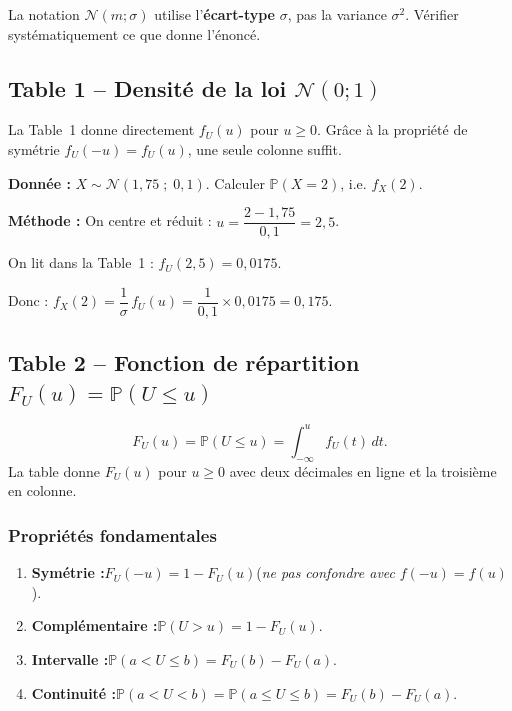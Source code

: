 \documentclass[11pt,a4paper]{article}
\newcommand{\N}{\mathcal{N}}
\newcommand{\Prob}{\mathbb{P}}
\renewcommand{\P}{\Prob}
\begin{document}
\begin{alertbox}[Attention]
La notation $\N(m;\sigma)$ utilise l'\textbf{\'ecart-type} $\sigma$, pas la variance $\sigma^2$. V\'erifier syst\'ematiquement ce que donne l'\'enonc\'e.
\end{alertbox}

\subsection{Table 1 -- Densit\'e de la loi $\N(0;1)$}

La Table~1 donne directement $f_U(u)$ pour $u \geq 0$. Gr\^ace \`a la propri\'et\'e de sym\'etrie $f_U(-u) = f_U(u)$, une seule colonne suffit.

\begin{exbox}
\textbf{Donn\'ee :} $X \sim \N(1{,}75\;;\;0{,}1)$. Calculer $\P(X = 2)$, i.e. $f_X(2)$.

\textbf{M\'ethode :} On centre et r\'eduit : $u = \dfrac{2-1{,}75}{0{,}1} = 2{,}5$.

On lit dans la Table~1 : $f_U(2{,}5) = 0{,}0175$.

Donc : $f_X(2) = \dfrac{1}{\sigma}\,f_U(u) = \dfrac{1}{0{,}1}\times 0{,}0175 = 0{,}175.$
\end{exbox}

\subsection{Table 2 -- Fonction de r\'epartition $F_U(u) = \P(U \leq u)$}

\begin{defbox}
$$F_U(u) = \P(U \leq u) = \int_{-\infty}^{u} f_U(t)\,dt.$$
La table donne $F_U(u)$ pour $u \geq 0$ avec deux d\'ecimales en ligne et la troisi\`eme en colonne.
\end{defbox}

\subsubsection{Propri\'et\'es fondamentales}

\begin{thmbox}[Propri\'et\'es de $F_U$]
\begin{enumerate}
\item \textbf{Sym\'etrie :}\quad $F_U(-u) = 1 - F_U(u)$\qquad (\textit{ne pas confondre avec} $f(-u) = f(u)$).
\item \textbf{Compl\'ementaire :}\quad $\P(U > u) = 1 - F_U(u)$.
\item \textbf{Intervalle :}\quad $\P(a < U \leq b) = F_U(b) - F_U(a)$.
\item \textbf{Continuit\'e :}\quad $\P(a < U < b) = \P(a \leq U \leq b) = F_U(b) - F_U(a)$.
\end{enumerate}
\end{thmbox}
\end{document}
